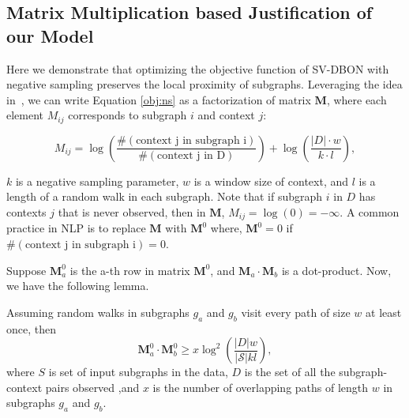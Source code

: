 \documentclass[sigconf]{acmart}
\newcommand{\s}{\mathcal{S}}
\newcommand{\N}{\mathbf{M}}
\newcommand{\M}{\mathbf{M}}
\begin{document}
\subsection{Matrix Multiplication based Justification of our Model}
Here we demonstrate that optimizing the objective function of SV-DBON with negative sampling preserves the local proximity of subgraphs. Leveraging the idea in~\cite{levy2014neural}, we can write Equation \ref{obj:ns}
as a factorization of matrix $\mathbf{M}$,  where  each element $M_{ij}$ corresponds to subgraph $i$ and context $j$:

\begin{equation}
M_{ij} = \log(\frac{\#(\text{context j in subgraph i})}{\#(\text{context j in D})}) + \log(\frac{|D| \cdot w}{k \cdot l}),
\end{equation}

$k$ is a negative sampling parameter, $w$ is a window size of context, and $l$ is a length of a random walk in each subgraph.  
Note that if  subgraph $i$ in $D$ has contexts $j$ that is never observed,  then in $\mathbf{M}$, $M_{ij} = \log(0) = - \infty$. A common practice in NLP is to replace $\N$ with $\M^{0}$ where, $\M^{0} = 0$ if  $\#(\text{context j in subgraph i}) = 0$. 

Suppose $\M^{0}_{a}$ is the a-th row in matrix $\M^{0}$, and $\M_a \cdot \M_b$ is a dot-product. Now, we have the following lemma.

\begin{lemma}
\label{lemma:factorization}
Assuming random walks in subgraphs $g_a$ and $g_b$ visit every path of size $w$ at least once, then
\begin{equation}
\M^{0}_{a} \cdot \M^{0}_{b} \geq x \log^2(\frac{|D|w}{|\s|kl}) ,
\end{equation}
where $S$ is set of input subgraphs in the data, $D$ is the set of all the subgraph-context pairs observed ,and $x$ is the number of overlapping paths of length $w$ in subgraphs $g_a$ and $g_b$.
\end{lemma}
\end{document}
